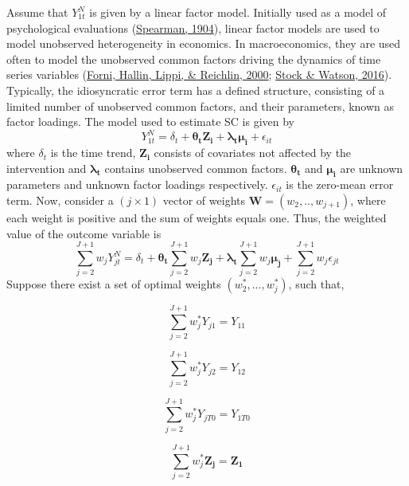 \documentclass[12pt,nobind, a4paper]{reedthesis}
\begin{document}
 Assume that \(Y^{N}_{1t}\) is given by a linear factor model. Initially used as a model of psychological evaluations (\protect\hyperlink{ref-spearman_general_1904}{Spearman, 1904}), linear factor models are used to model unobserved heterogeneity in economics. In macroeconomics, they are used often to model the unobserved common factors driving the dynamics of time series variables (\protect\hyperlink{ref-forni_generalized_2000}{Forni, Hallin, Lippi, \& Reichlin, 2000}; \protect\hyperlink{ref-stock_dynamic_2016}{Stock \& Watson, 2016}). Typically, the idiosyncratic error term has a defined structure, consisting of a limited number of unobserved common factors, and their parameters, known as factor loadings. The model used to estimate SC is given by
 \begin{equation}
 Y^{N}_{1t}= \delta_{t}+\mathbf{\theta_{t} Z_{i}}+\mathbf{\lambda_{t} \mu_{i}}+ \epsilon_{it}
 \label{eq:eq4}
 \end{equation}
 where \(\delta_{t}\) is the time trend, \(\mathbf{Z_{i}}\) consists of covariates not affected by the intervention and \(\mathbf{ \lambda_{t}}\) contains unobserved common factors. \(\mathbf{\theta_{t}}\) and \(\mathbf{\mu_{i}}\) are unknown parameters and unknown factor loadings respectively. \(\epsilon_{it}\) is the zero-mean error term. Now, consider a \((j\times 1)\) vector of weights \(\mathbf{W}=(w_{2},..,w_{j+1})\), where each weight is positive and the sum of weights equals one. Thus, the weighted value of the outcome variable is
 \begin{equation}
 \sum_{j=2}^{J+1}w_{j}Y^{N}_{jt}= \delta_{t}+
 \mathbf{\theta_{t}} \sum_{j=2}^{J+1}w_{j}\mathbf{Z_{j}}+
 \mathbf{\lambda_{t}} \sum_{j=2}^{J+1}w_{j}\mathbf{\mu_{j}}+ \sum_{j=2}^{J+1}w_{j}\epsilon_{jt}
 \label{eq:eq5}
 \end{equation}
 Suppose there exist a set of optimal weights \((w_{2}^{*},...,w_{j}^{*})\), such that,

 \[\sum_{j=2}^{J+1}w_{j}^{*}Y_{j1}=Y_{11}\]

 \[ \sum_{j=2}^{J+1}w_{j}^{*}Y_{j2}=Y_{12}\]

 \[\sum_{j=2}^{J+1}w_{j}^{*}Y_{jT0}=Y_{1T0} \]

 \[\sum_{j=2}^{J+1}w_{j}^{*} \mathbf{Z_{j}}=\mathbf{Z_{1}}\]
\end{document}
